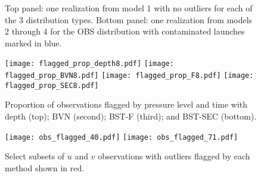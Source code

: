 \documentclass[12pt]{article}
\begin{document}
\begin{figure}[h!]
\begin{center}
	\caption{Top panel: one realization from  model 1 with no outliers for each of the 3 distribution types. Bottom panel: one realization from models 2 through 4 for the OBS distribution with contaminated launches marked in blue.}
	\label{fig:model}
	\end{center}
\end{figure}


\begin{figure}[h!]
\caption{Proportion of observations flagged by pressure level and time with  depth  (top); BVN (second);  BST-F  (third); and BST-SEC (bottom).}\label{fig:prop_compare}
\vspace{.25cm}
\centering
\texttt{[image: flagged\_prop\_depth8.pdf]}
\texttt{[image: flagged\_prop\_BVN8.pdf]}
\texttt{[image: flagged\_prop\_F8.pdf]}
\texttt{[image: flagged\_prop\_SEC8.pdf]}
\end{figure}



\begin{figure}[h!]
\caption{Select subsets of $u$ and $v$ observations with outliers flagged by each method shown in red. }\label{fig:2examples}
\vspace{.25cm}
\centering
\texttt{[image: obs\_flagged\_40.pdf]}
\texttt{[image: obs\_flagged\_71.pdf]}
\end{figure}




%
\end{document}

